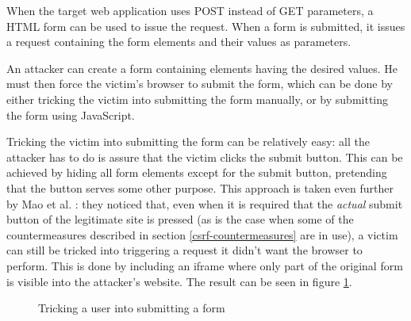 When the target web application uses POST instead of GET parameters, a HTML form can be used to issue the request. When a form is submitted, it issues a request containing the form elements and their values as parameters.

An attacker can create a form containing elements having the desired values. He must then force the victim's browser to submit the form, which can be done by either tricking the victim into submitting the form manually, or by submitting the form using JavaScript.

Tricking the victim into submitting the form can be relatively easy: all the attacker has to do is assure that the victim clicks the submit button. This can be achieved by hiding all form elements except for the submit button, pretending that the button serves some other purpose. This approach is taken even further by Mao et al. \cite{Mao2009}: they noticed that, even when it is required that the \emph{actual} submit button of the legitimate site is pressed (as is the case when some of the countermeasures described in section \ref{csrf-countermeasures} are in use), a victim can still be tricked into triggering a request it didn't want the browser to perform. This is done by including an iframe where only part of the original form is visible into the attacker's website. The result can be seen in figure \ref{fig:mao2009}.

\begin{figure}[ht]
	\centering
	\caption{Tricking a user into submitting a form \cite{Mao2009}}
	\label{fig:mao2009}
\end{figure}

